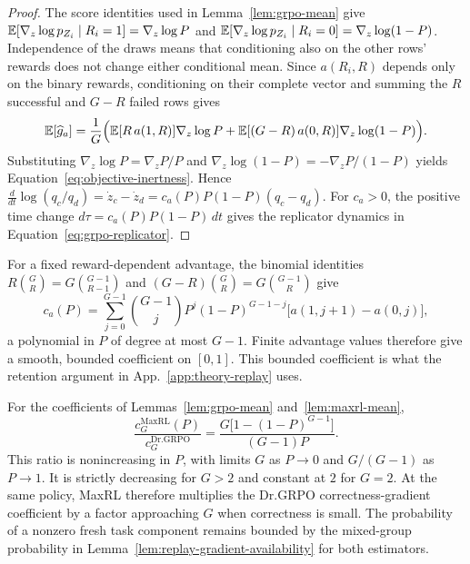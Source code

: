 \begin{proof}
\enforcehalffinalproseline
The score identities used in Lemma~\ref{lem:grpo-mean} give
$\mathbb E[\nabla_z\log p_{Z_i}\mid R_i=1]=\nabla_z\log P$ and
$\mathbb E[\nabla_z\log p_{Z_i}\mid R_i=0]=\nabla_z\log(1-P)$.
Independence of the draws means that conditioning also on the other rows'
rewards does not change either conditional mean. Since $a(R_i,R)$ depends
only on the binary rewards, conditioning on their complete vector and
summing the $R$ successful and $G-R$ failed rows gives
\[
  \mathbb E[\widehat g_a]
  =\frac1G\Big(\mathbb E[R\,a(1,R)]\nabla_z\log P
   +\mathbb E[(G-R)\,a(0,R)]\nabla_z\log(1-P)\Big).
\]
Substituting $\nabla_z\log P=\nabla_zP/P$ and
$\nabla_z\log(1-P)=-\nabla_zP/(1-P)$ yields
Equation~\eqref{eq:objective-inertness}. Hence
$\frac{d}{dt}\log(q_c/q_d)=\dot z_c-\dot z_d=c_a(P)P(1-P)(q_c-q_d)$.
For $c_a>0$, the positive time change $d\tau=c_a(P)P(1-P)\,dt$ gives
the replicator dynamics in Equation~\eqref{eq:grpo-replicator}.
\end{proof}

For a fixed reward-dependent advantage, the binomial identities
$R\binom GR=G\binom{G-1}{R-1}$ and
$(G-R)\binom GR=G\binom{G-1}{R}$ give
\begin{equation}
 c_a(P)=\sum_{j=0}^{G-1}\binom{G-1}{j}P^j(1-P)^{G-1-j}
 \big[a(1,j+1)-a(0,j)\big],
 \label{eq:inertness-polynomial}
\end{equation}
a polynomial in $P$ of degree at most $G-1$. Finite advantage values
therefore give a smooth, bounded coefficient on $[0,1]$. This bounded coefficient is what the retention argument in
App.~\ref{app:theory-replay} uses.

\begin{corollary}
\enforcehalffinalproseline
\label{cor:maxrl-starvation}
For the coefficients of Lemmas~\ref{lem:grpo-mean} and~\ref{lem:maxrl-mean},
\[
 \frac{c_G^{\mathrm{MaxRL}}(P)}{c_G^{\mathrm{Dr.GRPO}}}
 =\frac{G\big[1-(1-P)^{G-1}\big]}{(G-1)P}.
\]
This ratio is nonincreasing in $P$, with limits $G$ as $P\to0$ and
$G/(G-1)$ as $P\to1$. It is strictly decreasing for $G>2$ and constant
at $2$ for $G=2$. At the same policy, MaxRL therefore multiplies the
Dr.GRPO correctness-gradient coefficient by a factor approaching $G$ when
correctness is small. The probability of a nonzero fresh task component
remains bounded by the mixed-group probability in
Lemma~\ref{lem:replay-gradient-availability} for both estimators.
\end{corollary}

